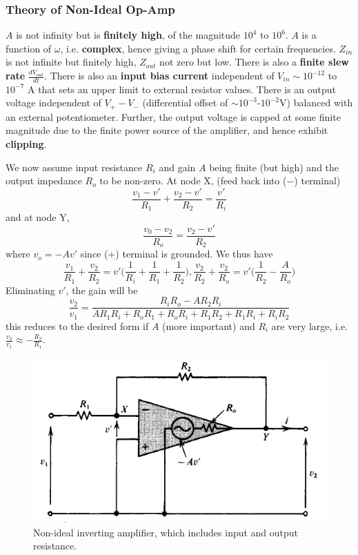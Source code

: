 \documentclass[a4paper]{article}
\begin{document}
\subsubsection*{Theory of Non-Ideal Op-Amp~\cite{ahmed_spreadbury_1984}}
\begin{Note}
$A$ is not infinity but is \textbf{finitely high}, of the magnitude $10^4$ to $10^6$. $A$ is a function of $\omega$, i.e. \textbf{complex}, hence giving a phase shift for certain frequencies. $Z_{in}$ is not infinite but finitely high, $Z_{out}$ not zero but low. There is also a \textbf{finite slew rate} $\frac{dV_{out}}{dt}$. There is also an \textbf{input bias current} independent of $V_{in}\sim10^{-12}$ to $10^{-7}$ A that sets an upper limit to external resistor values. There is an output voltage independent of $V_+-V_-$ (differential offset of $\sim10^{-3}$-$10^{-2}$V) balanced with an external potentiometer. Further, the output voltage is capped at some finite magnitude due to the finite power source of the amplifier, and hence exhibit \textbf{clipping}. 
\end{Note}
\begin{eg}
We now assume input resistance $R_i$ and gain $A$ being finite (but high) and the output impedance $R_o$ to be non-zero. At node X, (feed back into ($-$) terminal)
$$\frac{v_1-v'}{R_1}+\frac{v_2-v'}{R_2}=\frac{v'}{R_i}$$
and at node Y,
$$\frac{v_0-v_2}{R_o}=\frac{v_2-v'}{R_2}$$
where $v_o=-Av'$ since ($+$) terminal is grounded. We thus have
$$\frac{v_1}{R_1}+\frac{v_2}{R_2}=v'\bigg(\frac{1}{R_i}+\frac{1}{R_1}+\frac{1}{R_2}\bigg),\frac{v_2}{R_2}+\frac{v_2}{R_o}=v'\bigg(\frac{1}{R_2}-\frac{A}{R_o}\bigg)$$
Eliminating $v'$, the gain will be
$$\frac{v_2}{v_1}=\frac{R_iR_o-AR_2R_i}{AR_1R_i+R_oR_1+R_oR_i+R_1R_2+R_1R_i+R_iR_2}$$
this reduces to the desired form if $A$ (more important) and $R_i$ are very large, i.e. $\frac{v_2}{v_1}\approx -\frac{R_2}{R_1}$.
\end{eg}
\begin{figure}[H]
    \centering
    \includegraphics[scale=0.9]{nonidealinverting.PNG}
    \caption{Non-ideal inverting amplifier, which includes input and output resistance.}
    \label{nonidealinverting}
\end{figure}
\end{document}
